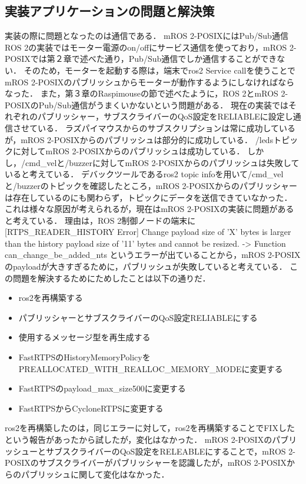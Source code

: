 \begin{itemize}
\section{実装アプリケーションの問題と解決策}
実装の際に問題となったのは通信である．
mROS 2-POSIXにはPub/Sub通信
ROS 2の実装ではモーター電源のon/offにサービス通信を使っており，mROS 2-POSIXでは第２章で述べた通り，Pub/Sub通信でしか通信することができない．
そのため，モーターを起動する際は，端末でros2 Service callを使うことでmROS 2-POSIXのパブリッシュからモーターが動作するようにしなければならなった．
また，第３章のRaspimouseの節で述べたように，ROS 2とmROS 2-POSIXのPub/Sub通信がうまくいかないという問題がある．
現在の実装ではそれぞれのパブリッシャー，サブスクライバーのQoS設定をRELIABLEに設定し通信させている．
ラズパイマウスからのサブスクリプションは常に成功しているが，mROS 2-POSIXからのパブリッシュは部分的に成功している．
/ledsトピックに対してmROS 2-POSIXからのパブリッシュは成功している．
しかし，/cmd\_velと/buzzerに対してmROS 2-POSIXからのパブリッシュは失敗していると考えている．
デバックツールであるros2 topic infoを用いて/cmd\_velと/buzzerのトピックを確認したところ，mROS 2-POSIXからのパブリッシャーは存在しているのにも関わらず，トピックにデータを送信できていなかった．
これは様々な原因が考えられるが，現在はmROS 2-POSIXの実装に問題があると考えている．
理由は，ROS 2制御ノードの端末に [RTPS\_READER\_HISTORY Error] Change payload size of 'X' bytes is larger than the history payload size of '11' bytes and cannot be resized. -> Function can\_change\_be\_added\_nts
というエラーが出ていることから，mROS 2-POSIXのpayloadが大きすぎるために，パブリッシュが失敗していると考えている．
この問題を解決するためにためしたことは以下の通りだ．
\begin{itemize}
    \item ros2を再構築する
    \item パブリッシャーとサブスクライバーのQoS設定RELIABLEにする
    \item 使用するメッセージ型を再生成する
    \item FastRTPSのHistoryMemoryPolicyをPREALLOCATED\_WITH\_REALLOC\_MEMORY\_MODEに変更する
    \item FastRTPSのpayload\_max\_size500に変更する
    \item FastRTPSからCycloneRTPSに変更する
\end{itemize}
ros2を再構築したのは，同じエラーに対して，ros2を再構築することでFIXしたという報告があったから試したが，変化はなかった．
mROS 2-POSIXのパブリッシューとサブスクライバーのQoS設定をRELEABLEにすることで，mROS 2-POSIXのサブスクライバーがパブリッシャーを認識したが，mROS 2-POSIXからのパブリッシュに関して変化はなかった．

\end{itemize}
